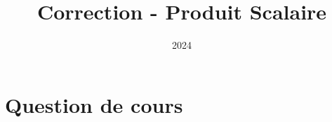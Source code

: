 \documentclass[10pt,a4paper]{article}
\title{Correction - Produit Scalaire}
\author{}
\date{2024}
\begin{document}
\maketitle

\section*{Question de cours}
\end{document}
